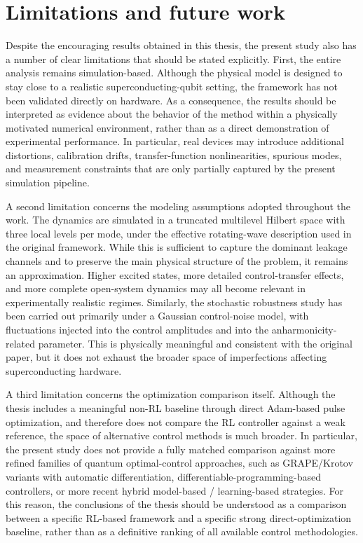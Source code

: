 \section{Limitations and future work}
\label{sec:limitations_future_work}

Despite the encouraging results obtained in this thesis, the present study also has a number of clear limitations that should be stated explicitly. First, the entire analysis remains simulation-based. Although the physical model is designed to stay close to a realistic superconducting-qubit setting, the framework has not been validated directly on hardware. As a consequence, the results should be interpreted as evidence about the behavior of the method within a physically motivated numerical environment, rather than as a direct demonstration of experimental performance. In particular, real devices may introduce additional distortions, calibration drifts, transfer-function nonlinearities, spurious modes, and measurement constraints that are only partially captured by the present simulation pipeline.

A second limitation concerns the modeling assumptions adopted throughout the work. The dynamics are simulated in a truncated multilevel Hilbert space with three local levels per mode, under the effective rotating-wave description used in the original framework. While this is sufficient to capture the dominant leakage channels and to preserve the main physical structure of the problem, it remains an approximation. Higher excited states, more detailed control-transfer effects, and more complete open-system dynamics may all become relevant in experimentally realistic regimes. Similarly, the stochastic robustness study has been carried out primarily under a Gaussian control-noise model, with fluctuations injected into the control amplitudes and into the anharmonicity-related parameter. This is physically meaningful and consistent with the original paper, but it does not exhaust the broader space of imperfections affecting superconducting hardware.

A third limitation concerns the optimization comparison itself. Although the thesis includes a meaningful non-RL baseline through direct Adam-based pulse optimization, and therefore does not compare the RL controller against a weak reference, the space of alternative control methods is much broader. In particular, the present study does not provide a fully matched comparison against more refined families of quantum optimal-control approaches, such as GRAPE/Krotov variants with automatic differentiation, differentiable-programming-based controllers, or more recent hybrid model-based / learning-based strategies. For this reason, the conclusions of the thesis should be understood as a comparison between a specific RL-based framework and a specific strong direct-optimization baseline, rather than as a definitive ranking of all available control methodologies.

